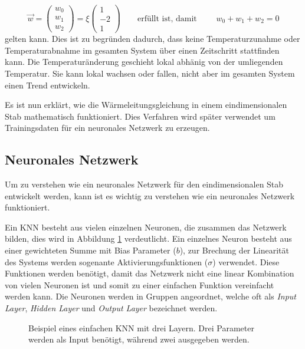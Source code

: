 \begin{equation}
	\vec{w} = \begin{pmatrix} w_{0} \\ w_{1} \\ w_{2} \end{pmatrix} = \xi \begin{pmatrix} 1 \\ -2 \\ 1 \end{pmatrix}
	\qquad\text{erfüllt ist, damit }\qquad
	w_{0} + w_{1} + w_{2} = 0
\end{equation}
gelten kann. Dies ist zu begründen dadurch, dass keine Temperaturzunahme oder Temperaturabnahme im gesamten System über einen Zeitschritt stattfinden kann. Die Temperaturänderung geschieht lokal abhänig von der umliegenden Temperatur. Sie kann lokal wachsen oder fallen, nicht aber im gesamten System einen Trend entwickeln.

Es ist nun erklärt, wie die Wärmeleitungsgleichung in einem eindimensionalen Stab mathematisch funktioniert. Dies Verfahren wird später verwendet um Trainingsdaten für ein neuronales Netzwerk zu erzeugen.


\subsection{Neuronales Netzwerk}

Um zu verstehen wie ein neuronales Netzwerk für den eindimensionalen Stab entwickelt werden, kann ist es wichtig zu verstehen wie ein neuronales Netzwerk funktioniert.

Ein KNN besteht aus vielen einzelnen Neuronen, die zusammen das Netzwerk bilden, dies wird in Abbildung \ref{fig:mst_neuronalnetwork} verdeutlicht. Ein einzelnes Neuron besteht aus einer gewichteten Summe mit Bias Parameter ($b$), zur Brechung der Linearität des Systems werden sogenante Aktivierungsfunktionen ($\sigma$) verwendet. Diese Funktionen werden benötigt, damit das Netzwerk nicht eine linear Kombination von vielen Neuronen ist und somit zu einer einfachen Funktion vereinfacht werden kann. Die Neuronen werden in Gruppen angeordnet, welche oft als \textit{Input Layer}, \textit{Hidden Layer} und \textit{Output Layer} bezeichnet werden. 

\begin{figure}
	\centering
	
	\label{fig:mst_neuronalnetwork}
	\caption{Beispiel eines einfachen KNN mit drei Layern. Drei Parameter werden als Input benötigt, während zwei ausgegeben werden.}
\end{figure}

